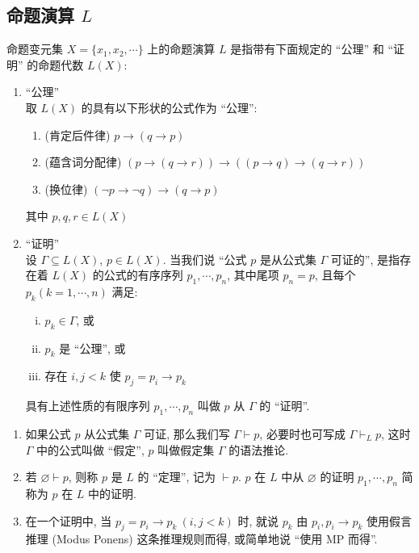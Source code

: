 \documentclass[
    mode=hazy,
    color=blue,
    device=normal,
    lang=cn
]{elegantnote}
\begin{document}
        \subsection{命题演算 $L$}
        \begin{definition}[命题演算 $L$]
            \label{def:2.3}
            命题变元集 $X=\{x_1, x_2,\cdots\}$ 上的命题演算 $L$ 是指带有下面规定的 ``公理'' 和 ``证明'' 的命题代数 $L(X)$:
            \begin{enumerate}[(1)]
                \item ``公理''\\
                取 $L(X)$ 的具有以下形状的公式作为 ``公理'':
                \begin{enumerate}[label=(L\arabic*)]
                    \item (肯定后件律) $p\to (q\to p)$
                    \item (蕴含词分配律) $(p\to (q\to r))\to ((p\to q)\to (q\to r))$
                    \item (换位律) $(\lnot p\to \lnot q)\to (q\to p)$
                \end{enumerate}
                其中 $p,q,r\in L(X)$
                \item ``证明''\\
                设 $\Gamma\subseteq L(X)$, $p\in L(X)$. 当我们说 ``公式 $p$ 是从公式集 $\Gamma$ 可证的'', 是指存在着 $L(X)$ 的公式的有序序列 $p_1, \cdots, p_n$, 其中尾项 $p_n=p$, 且每个 $p_k(k=1,\cdots, n)$ 满足:
                \begin{enumerate}[(i)]
                    \item $p_k\in\Gamma$, 或
                    \item $p_k$ 是 ``公理'', 或
                    \item 存在 $i,j < k$ 使 $p_j=p_i\to p_k$
                \end{enumerate}
                具有上述性质的有限序列 $p_1, \cdots, p_n$ 叫做 $p$ 从 $\Gamma$ 的 ``证明''.
            \end{enumerate}
        \end{definition}
        \begin{definition}[语法推论]
            \begin{enumerate}[(1)]
                \item 如果公式 $p$ 从公式集 $\Gamma$ 可证, 那么我们写 $\Gamma\vdash p$, 必要时也可写成 $\Gamma\vdash_L p$, 这时 $\Gamma$ 中的公式叫做 ``假定'', $p$ 叫做假定集 $\Gamma$ 的语法推论.
                \item 若 $\varnothing\vdash p$, 则称 $p$ 是 $L$ 的 ``定理'', 记为 $\vdash p$. $p$ 在 $L$ 中从 $\varnothing$ 的证明 $p_1, \cdots, p_n$ 简称为 $p$ 在 $L$ 中的证明.
                \item 在一个证明中, 当 $p_j=p_i\to p_k\ (i,j<k)$ 时, 就说 $p_k$ 由 $p_i, p_i\to p_k$ 使用假言推理 (Modus Ponens) 这条推理规则而得, 或简单地说 ``使用 MP 而得''.
            \end{enumerate}
        \end{definition}
\end{document}
